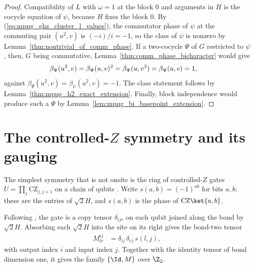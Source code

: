 \begin{proof}\leanok
    Compatibility of $L$ with $\omega=1$ at the block $0$ and arguments in $H$
    is the cocycle equation of $\psi$, because $H$ fixes the block $0$. By
    (\ref{eq:mpug_ghz_cluster_l_values}), the commutator phase of $\psi$ at the
    commuting pair $(u^2,v)$ is $(-i)/i=-1$, so the class of $\psi$ is
    nonzero by Lemma~\ref{thm:nontrivial_of_comm_phase}. If a two-cocycle
    $\Psi$ of $G$ restricted to $\psi$, then, $G$ being commutative,
    Lemma~\ref{thm:comm_phase_bicharacter} would give
    \begin{align}
        \beta_\Psi(u^2,v) & =\beta_\Psi(u,v)^2=\beta_\Psi(u,v^2)
        =\beta_\Psi(u,e)=1,
        \notag
    \end{align}
    against $\beta_\Psi(u^2,v)=\beta_\psi(u^2,v)=-1$. The class statement
    follows by Lemma~\ref{thm:mpug_h2_exact_extension}. Finally, block
    independence would produce such a $\Psi$ by
    Lemma~\ref{lem:mpug_bi_basepoint_extension}.
\end{proof}

\section{The controlled-\texorpdfstring{$Z$}{Z} symmetry and its gauging}
\label{sec:mpug_controlled_z}

The simplest symmetry that is not onsite is the ring of controlled-$Z$ gates
$U=\prod_j\mathrm{CZ}_{j,j+1}$ on a chain of qubits
\cite[lines~3794--3968]{FrancoRubio2025MPUGauging}. Write
$s(a,b)=(-1)^{ab}$ for bits $a,b$; these are the entries of $\sqrt2H$, and
$s(a,b)$ is the phase of $\mathrm{CZ}\ket{a,b}$.

\begin{definition}
    \label{def:mpug_controlled_z_tensor}
    \leanok
    Following \cite[eq.~(CZ) and eq.~(deltas)]{FrancoRubio2025MPUGauging}, the
    gate is a copy tensor $\delta_{ijr}$ on each qubit joined along the bond by
    $\sqrt2H$. Absorbing each $\sqrt2H$ into the site on its right gives the
    bond-two tensor
    \begin{align}
        M^{ij}_{lr} & =\delta_{ij}\,\delta_{rj}\,s(l,j),
        \label{eq:mpug_controlled_z_tensor}
    \end{align}
    with output index $i$ and input index $j$. Together with the identity
    tensor of bond dimension one, it gives the family $\{\Id,M\}$ over $\Z_2$.
\end{definition}

